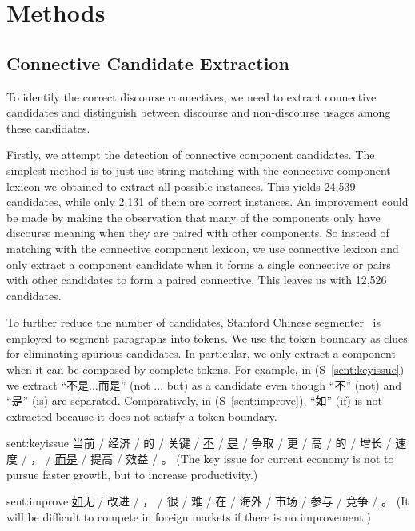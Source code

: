 %
%
%
\chapter{Methods}
\label{c:method}

\section{Connective Candidate Extraction}

To identify the correct discourse connectives, we need to
extract connective candidates and distinguish between discourse
and non-discourse usages among these candidates.

Firstly, we attempt the detection of connective component candidates.
The simplest method is to just use string matching with the connective
component lexicon we obtained to extract all possible instances. This yields
24,539 candidates, while only 2,131 of them are correct instances. An improvement
could be made by making the observation that many of the components only have
discourse meaning when they are paired with other components. So instead of matching
with the connective component lexicon, we use connective lexicon and only extract
a component candidate when it forms a single connective or pairs with
other candidates to form a paired connective. This leaves us with 12,526 candidates.

To further reduce the number of candidates, Stanford Chinese
segmenter~\citep{chang2008optimizing} is employed to segment paragraphs into tokens. We use
the token boundary as clues for eliminating spurious candidates. In particular,
we only extract a component when it can be composed by complete tokens. For example,
in (S~\ref{sent:keyissue}) we extract ``不是...而是'' (not ... but) as a candidate
even though ``不'' (not) and ``是'' (is) are separated. Comparatively, in (S~\ref{sent:improve}),
``如'' (if) is not extracted because it does not satisfy a token boundary.

\begin{sent}{sent:keyissue}{}
    当前 / 经济 / 的 / 关键 / \underline{不} / \underline{是} / 争取 / 更 /
    高 / 的 / 增长 / 速度 / ， / \underline{而是} / 提高 / 效益 / 。
    (The key issue for current economy is not to pursue faster growth, but to
    increase productivity.)
\end{sent}

\begin{sent}{sent:improve}{}
    \underline{如}无 / 改进 / ， / 很 / 难 / 在 / 海外 / 市场 / 参与 / 竞争 /
    。 (It will be difficult to compete in foreign markets if there is no
    improvement.)
\end{sent}

